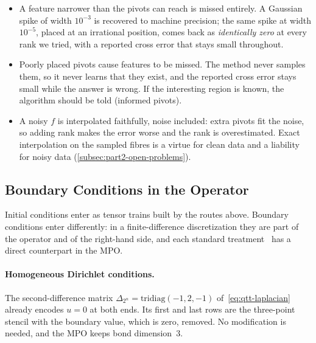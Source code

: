 \begin{remark}
  \begin{itemize}
    \item A feature narrower than the pivots can reach is missed entirely. A
      Gaussian spike of width $10^{-3}$ is recovered to machine precision; the
      same spike at width $10^{-5}$, placed at an irrational position, comes
      back as \emph{identically zero} at every rank we tried, with a reported
      cross error that stays small throughout.
    \item Poorly placed pivots cause features to be missed. The method never
      samples them, so it never learns that they exist, and the reported cross
      error stays small while the answer is wrong. If the interesting region is
      known, the algorithm should be told (informed pivots).
    \item A noisy $f$ is interpolated faithfully, noise included: extra pivots
      fit the noise, so adding rank makes the error worse and the rank is
      overestimated. Exact interpolation on the sampled fibres is a virtue for
      clean data and a liability for noisy data
      (\cref{subsec:part2-open-problems}).
  \end{itemize}
\end{remark}

\subsection{Boundary Conditions in the Operator}
\label{subsec:boundary-conditions}

Initial conditions enter as tensor trains built by the routes above. Boundary
conditions enter differently: in a finite-difference discretization they are
part of the operator and of the right-hand side, and each standard
treatment~\cite{LeVeque2007} has a direct counterpart in the MPO.

\paragraph{Homogeneous Dirichlet conditions.}
The second-difference matrix $\Delta_{2^n} = \mathrm{tridiag}(-1, 2, -1)$
of~\eqref{eq:qtt-laplacian} already encodes $u = 0$ at both ends. Its first and
last rows are the three-point stencil with the boundary value, which is zero,
removed. No modification is needed, and the MPO keeps bond dimension~$3$.

